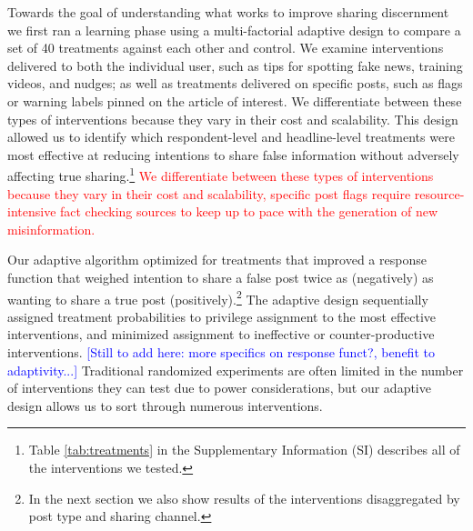 \documentclass[letterpaper, 12pt, parskip=full,DIV=10]{scrartcl}
\begin{document}


Towards the goal of understanding what works to improve sharing discernment we first ran a learning phase using a multi-factorial adaptive design to compare a set of 40 treatments against each other and control.  We examine interventions delivered to both the individual user, such as tips for spotting fake news, training videos, and nudges; as well as treatments delivered on specific posts, such as flags or warning labels pinned on the article of interest. We differentiate between these types of interventions because they vary in their cost and scalability. This design allowed us to identify which respondent-level and headline-level treatments were most effective at reducing intentions to share false information without adversely affecting true sharing.\footnote{Table \ref{tab:treatments} in the Supplementary Information (SI) describes all of the interventions we tested.} \textcolor{red}{We differentiate between these types of interventions because they vary in their cost and scalability, specific post flags require resource-intensive fact checking sources to keep up to pace with the generation of new misinformation.}

Our adaptive algorithm optimized for treatments that improved a response function that weighed intention to share a false post twice as (negatively) as wanting to share a true post (positively).\footnote{In the next section we also show results of the interventions disaggregated by post type and sharing channel.} The adaptive design sequentially assigned treatment probabilities to privilege assignment to the most effective interventions, and minimized assignment to ineffective or counter-productive interventions.  \textcolor{blue}{[Still to add here: more specifics on response funct?,  benefit to adaptivity...]} Traditional randomized experiments are often limited in the number of interventions they can test due to power considerations, but our adaptive design allows us to sort through numerous interventions. 
\end{document}
